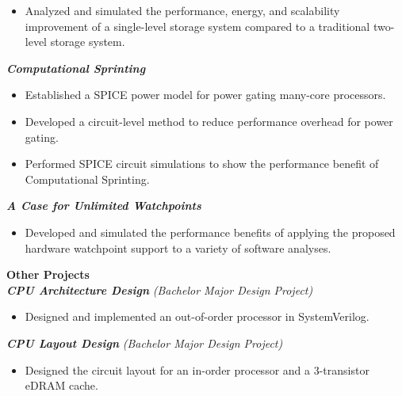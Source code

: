\documentclass{cv}
\begin{document}
\begin{resume}
\begin{itemize}
  \item Analyzed and simulated the performance, energy, and scalability improvement of a single-level storage system compared to a traditional two-level storage system.
\end{itemize}
{\bf \em Computational Sprinting}
\begin{itemize} \itemsep -2pt %
  \item Established a SPICE power model for power gating many-core processors.
  \item Developed a circuit-level method to reduce performance overhead for power gating.
  \item Performed SPICE circuit simulations to show the performance benefit of Computational Sprinting.
\end{itemize}
{\bf \em A Case for Unlimited Watchpoints}
\begin{itemize} \itemsep -2pt %
  \item Developed and simulated the performance benefits of applying the proposed hardware watchpoint support to a variety of software analyses.
\end{itemize}
{\bf Other Projects} \vspace{2pt} \\
{\bf \em CPU Architecture Design} \emph{(Bachelor Major Design Project)}
\begin{itemize} \itemsep -2pt %
  \item Designed and implemented an out-of-order processor in SystemVerilog.
\end{itemize}
{\bf \em CPU Layout Design} \emph{(Bachelor Major Design Project)}
\begin{itemize} \itemsep -2pt %
  \item Designed the circuit layout for an in-order processor and a 3-transistor
    eDRAM cache.
\end{itemize}
\vspace{-6pt}


\vspace{0.2in}

\end{resume}
\end{document}
